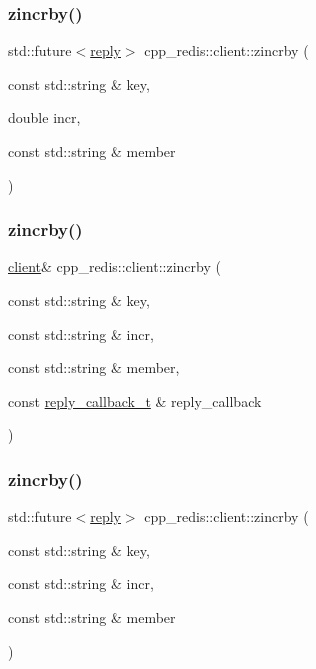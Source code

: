 \subsubsection{\texorpdfstring{zincrby()}{zincrby()}\hspace{0.1cm}{\footnotesize\ttfamily [4/6]}}
{\footnotesize\ttfamily std\+::future$<$\hyperlink{classcpp__redis_1_1reply}{reply}$>$ cpp\+\_\+redis\+::client\+::zincrby (\begin{DoxyParamCaption}\item[{const std\+::string \&}]{key,  }\item[{double}]{incr,  }\item[{const std\+::string \&}]{member }\end{DoxyParamCaption})}

\mbox{\label{classcpp__redis_1_1client_a6f0b61b420ebc8e054c766c6f5034096}} 
\subsubsection{\texorpdfstring{zincrby()}{zincrby()}\hspace{0.1cm}{\footnotesize\ttfamily [5/6]}}
{\footnotesize\ttfamily \hyperlink{classcpp__redis_1_1client}{client}\& cpp\+\_\+redis\+::client\+::zincrby (\begin{DoxyParamCaption}\item[{const std\+::string \&}]{key,  }\item[{const std\+::string \&}]{incr,  }\item[{const std\+::string \&}]{member,  }\item[{const \hyperlink{classcpp__redis_1_1client_a061a1140d36d2eaeda82b09a0bb3f9f2}{reply\+\_\+callback\+\_\+t} \&}]{reply\+\_\+callback }\end{DoxyParamCaption})}

\mbox{\label{classcpp__redis_1_1client_a202a2adbf6e0d127ad1c5cc301754e5b}} 
\subsubsection{\texorpdfstring{zincrby()}{zincrby()}\hspace{0.1cm}{\footnotesize\ttfamily [6/6]}}
{\footnotesize\ttfamily std\+::future$<$\hyperlink{classcpp__redis_1_1reply}{reply}$>$ cpp\+\_\+redis\+::client\+::zincrby (\begin{DoxyParamCaption}\item[{const std\+::string \&}]{key,  }\item[{const std\+::string \&}]{incr,  }\item[{const std\+::string \&}]{member }\end{DoxyParamCaption})}

